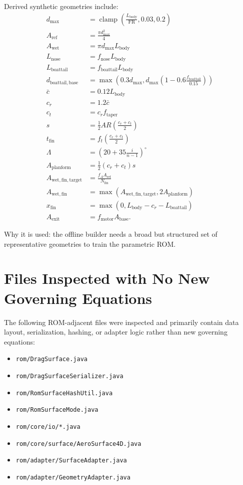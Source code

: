\documentclass[11pt]{article}
\begin{document}
Derived synthetic geometries include:
\begin{align*}
d_{\max} &= \operatorname{clamp}\!\left(\frac{L_{\mathrm{body}}}{\mathrm{FR}},0.03,0.2\right) \\
A_{\mathrm{ref}} &= \frac{\pi d_{\max}^2}{4} \\
A_{\mathrm{wet}} &= \pi d_{\max}L_{\mathrm{body}} \\
L_{\mathrm{nose}} &= f_{\mathrm{nose}}L_{\mathrm{body}} \\
L_{\mathrm{boattail}} &= f_{\mathrm{boattail}}L_{\mathrm{body}} \\
d_{\mathrm{boattail,base}} &= \max\!\left(0.3d_{\max}, d_{\max}\left(1 - 0.6\frac{f_{\mathrm{boattail}}}{0.15}\right)\right) \\
\bar c &= 0.12L_{\mathrm{body}} \\
c_r &= 1.2\bar c \\
c_t &= c_r f_{\mathrm{taper}} \\
s &= \frac{1}{2}AR\left(\frac{c_r+c_t}{2}\right) \\
t_{\mathrm{fin}} &= f_t\left(\frac{c_r+c_t}{2}\right) \\
\Lambda &= \left(20 + 35\frac{i}{n-1}\right)^\circ \\
A_{\mathrm{planform}} &= \frac{1}{2}(c_r+c_t)s \\
A_{\mathrm{wet,fin,target}} &= \frac{f_A A_{\mathrm{ref}}}{N_{\mathrm{fin}}} \\
A_{\mathrm{wet,fin}} &= \max\!\left(A_{\mathrm{wet,fin,target}}, 2A_{\mathrm{planform}}\right) \\
x_{\mathrm{fin}} &= \max(0, L_{\mathrm{body}} - c_r - L_{\mathrm{boattail}}) \\
A_{\mathrm{exit}} &= f_{\mathrm{motor}}A_{\mathrm{base}}.
\end{align*}

Why it is used: the offline builder needs a broad but structured set of representative geometries to train the parametric ROM.

\section{Files Inspected with No New Governing Equations}
The following ROM-adjacent files were inspected and primarily contain data layout, serialization, hashing, or adapter logic rather than new governing equations:
\begin{itemize}
\item \texttt{rom/DragSurface.java}
\item \texttt{rom/DragSurfaceSerializer.java}
\item \texttt{rom/RomSurfaceHashUtil.java}
\item \texttt{rom/RomSurfaceMode.java}
\item \texttt{rom/core/io/*.java}
\item \texttt{rom/core/surface/AeroSurface4D.java}
\item \texttt{rom/adapter/SurfaceAdapter.java}
\item \texttt{rom/adapter/GeometryAdapter.java}
\end{itemize}
\end{document}
